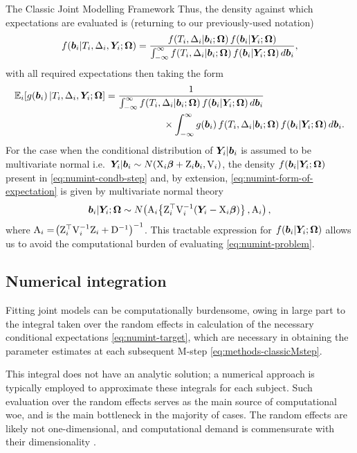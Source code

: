 \begin{chapter}{\label{cha:methods-classic}The Classic Joint Modelling Framework}
  Thus, the density against which expectations are evaluated is (returning to our previously-used notation)
  \begin{equation}
    f\!\left(\bm{b}_i|T_i, \Delta_i, \bm{Y}_i; \bm{\mathrm{\Omega}}\right)=\frac{f\!\left( T_i,\Delta_i|\bm{b}_i;\bm{\mathrm{\Omega}}\right)f\!\left(\bm{b}_i|\bm{Y}_i;\bm{\mathrm{\Omega}}\right)}{\int_{-\infty}^\infty f\!\left( T_i,\Delta_i|\bm{b}_i;\bm{\mathrm{\Omega}}\right)f\!\left(\bm{b}_i|\bm{Y}_i;\bm{\mathrm{\Omega}}\right) d\bm{b}_i},
  \label{eq:numint-expandtarget}
  \end{equation}
  with all required expectations then taking the form
  \begin{equation}
    \begin{aligned}
        \mathbb{E}_i\!\left[ g\!\left(\bm{b}_i\right)|T_i,\Delta_i,\bm{Y}_i;\bm{\mathrm{\Omega}}\right]&=\frac{1}{\int_{-\infty}^\infty f\!\left( T_i,\Delta_i|\bm{b}_i;\bm{\mathrm{\Omega}}\right)f\!\left(\bm{b}_i|\bm{Y}_i;\bm{\mathrm{\Omega}}\right) d\bm{b}_i}\\
        &\qquad\qquad\qquad\times\int_{-\infty}^\infty g\!\left(\bm{b}_i\right)f\!\left( T_i,\Delta_i|\bm{b}_i;\bm{\mathrm{\Omega}}\right)f\!\left(\bm{b}_i|\bm{Y}_i;\bm{\mathrm{\Omega}}\right) d\bm{b}_i.
    \end{aligned}    
  \label{eq:numint-form-of-expectation}
  \end{equation}
  For the case when the conditional distribution of $\bm{Y}_i|\bm{b}_i$ is assumed to be multivariate normal i.e.\ $\bm{Y}_i|\bm{b}_i\sim N\!\left(\mathrm{X}_i\bm{\beta}+\mathrm{Z}_i\bm{b}_i,\mathrm{V}_i\right)$, the density $f\!\left(\bm{b}_i|\bm{Y}_i;\bm{\mathrm{\Omega}}\right)$ present in \eqref{eq:numint-condb-step} and, by extension, \eqref{eq:numint-form-of-expectation} is given by multivariate normal theory \citep{Wulfsohn97, Lin2002, Hickey2018}
  \begin{equation}
      \bm{b}_i|\bm{Y}_i;\bm{\mathrm{\Omega}}\sim N\!\left(\mathrm{A}_i\!\left\{\mathrm{Z}_i^\top\mathrm{V}_i^{-1}\!\left(\bm{Y}_i-\mathrm{X}_i\bm{\beta}\right)\right\}, \mathrm{A}_i\right),
  \label{eq:b-cond-mvn}
  \end{equation}
  where $\mathrm{A}_i=\!\left(\mathrm{Z}_i^\top\mathrm{V}_i^{-1}\mathrm{Z}_i + \mathrm{D}^{-1}\right)^{-1}$. This tractable expression for $f\!\left(\bm{b}_i|\bm{Y}_i;\bm{\mathrm{\Omega}}\right)$ allows us to avoid the computational burden of evaluating \eqref{eq:numint-problem}.

\subsection{Numerical integration}\label{sec:numint-intro}
Fitting joint models can be computationally burdensome, owing in large part to the integral taken over the random effects in calculation of the necessary conditional expectations \eqref{eq:numint-target}, which are necessary in obtaining the parameter estimates at each subsequent M-step \eqref{eq:methods-classicMstep}. 

This integral does not have an analytic solution; a numerical approach is typically employed to approximate these integrals for each subject. Such evaluation over the random effects serves as the main source of computational woe, and is the main bottleneck in the majority of cases. The random effects are likely not one-dimensional, and computational demand is commensurate with their dimensionality \citep{Philipson2020}.


\end{chapter}
